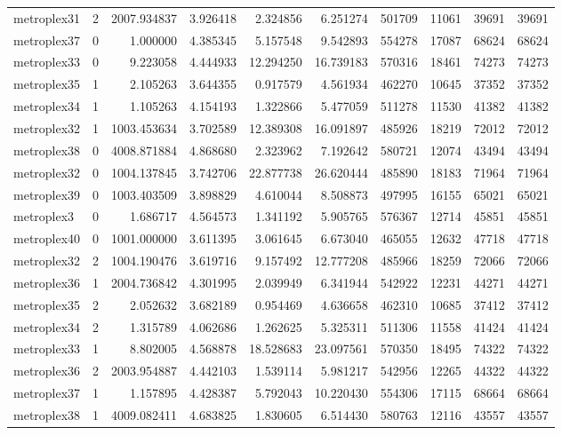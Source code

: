 \begin{longtable}{|l|r|r|r|r|r|r|r|r|r|}
metroplex31 & 2 & 2007.934837 & 3.926418 & 2.324856 & 6.251274 & 501709 & 11061 & 39691 & 39691 \\
metroplex37 & 0 & 1.000000 & 4.385345 & 5.157548 & 9.542893 & 554278 & 17087 & 68624 & 68624 \\
metroplex33 & 0 & 9.223058 & 4.444933 & 12.294250 & 16.739183 & 570316 & 18461 & 74273 & 74273 \\
metroplex35 & 1 & 2.105263 & 3.644355 & 0.917579 & 4.561934 & 462270 & 10645 & 37352 & 37352 \\
metroplex34 & 1 & 1.105263 & 4.154193 & 1.322866 & 5.477059 & 511278 & 11530 & 41382 & 41382 \\
metroplex32 & 1 & 1003.453634 & 3.702589 & 12.389308 & 16.091897 & 485926 & 18219 & 72012 & 72012 \\
metroplex38 & 0 & 4008.871884 & 4.868680 & 2.323962 & 7.192642 & 580721 & 12074 & 43494 & 43494 \\
metroplex32 & 0 & 1004.137845 & 3.742706 & 22.877738 & 26.620444 & 485890 & 18183 & 71964 & 71964 \\
metroplex39 & 0 & 1003.403509 & 3.898829 & 4.610044 & 8.508873 & 497995 & 16155 & 65021 & 65021 \\
metroplex3 & 0 & 1.686717 & 4.564573 & 1.341192 & 5.905765 & 576367 & 12714 & 45851 & 45851 \\
metroplex40 & 0 & 1001.000000 & 3.611395 & 3.061645 & 6.673040 & 465055 & 12632 & 47718 & 47718 \\
metroplex32 & 2 & 1004.190476 & 3.619716 & 9.157492 & 12.777208 & 485966 & 18259 & 72066 & 72066 \\
metroplex36 & 1 & 2004.736842 & 4.301995 & 2.039949 & 6.341944 & 542922 & 12231 & 44271 & 44271 \\
metroplex35 & 2 & 2.052632 & 3.682189 & 0.954469 & 4.636658 & 462310 & 10685 & 37412 & 37412 \\
metroplex34 & 2 & 1.315789 & 4.062686 & 1.262625 & 5.325311 & 511306 & 11558 & 41424 & 41424 \\
metroplex33 & 1 & 8.802005 & 4.568878 & 18.528683 & 23.097561 & 570350 & 18495 & 74322 & 74322 \\
metroplex36 & 2 & 2003.954887 & 4.442103 & 1.539114 & 5.981217 & 542956 & 12265 & 44322 & 44322 \\
metroplex37 & 1 & 1.157895 & 4.428387 & 5.792043 & 10.220430 & 554306 & 17115 & 68664 & 68664 \\
metroplex38 & 1 & 4009.082411 & 4.683825 & 1.830605 & 6.514430 & 580763 & 12116 & 43557 & 43557 \\

\end{longtable}
